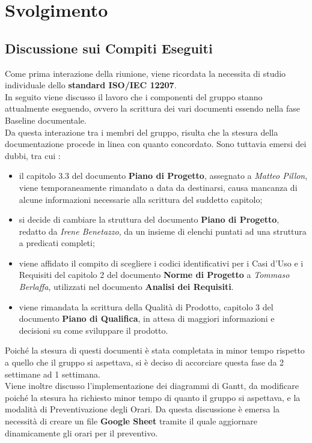 \section{Svolgimento}
\subsection{Discussione sui Compiti Eseguiti}
	Come prima interazione della riunione, viene ricordata la necessita di studio individuale dello \textbf{standard ISO/IEC 12207}. \\
	In seguito viene discusso il lavoro che i componenti del gruppo stanno attualmente eseguendo, ovvero la scrittura dei vari documenti essendo nella fase Baseline documentale. \\
	Da questa interazione tra i membri del gruppo, risulta che la stesura della documentazione procede in linea con quanto concordato. Sono tuttavia emersi dei dubbi, tra cui : 
	\begin{itemize}
		\item il capitolo 3.3 del documento \textbf{Piano di Progetto}, assegnato a \textit{Matteo Pillon}, viene temporaneamente rimandato a data da destinarsi, causa mancanza di alcune informazioni necessarie alla scrittura del suddetto capitolo;
		\item si decide di cambiare la struttura del documento \textbf{Piano di Progetto}, redatto da \textit{Irene Benetazzo}, da un insieme di elenchi puntati ad una struttura a predicati completi;
		\item viene affidato il compito di scegliere i codici identificativi per i Casi d'Uso e i Requisiti del capitolo 2 del documento \textbf{Norme di Progetto} a \textit{Tommaso Berlaffa}, utilizzati nel documento \textbf{Analisi dei Requisiti}.
		\item viene rimandata la scrittura della Qualità di Prodotto, capitolo 3 del documento \textbf{Piano di Qualifica}, in attesa di maggiori informazioni e decisioni su come sviluppare il prodotto.
	\end{itemize}
	Poiché la stesura di questi documenti è stata completata in minor tempo rispetto a quello che il gruppo si aspettava, si è deciso di accorciare questa fase da 2 settimane ad 1 settimana. \\
	Viene inoltre discusso l'implementazione dei diagrammi di Gantt, da modificare poiché la stesura ha richiesto minor tempo di quanto il gruppo si aspettava, e la modalità di Preventivazione degli Orari. Da questa discussione è emersa la necessità di creare un file \textbf{Google Sheet} tramite il quale aggiornare dinamicamente gli orari per il preventivo.
	

